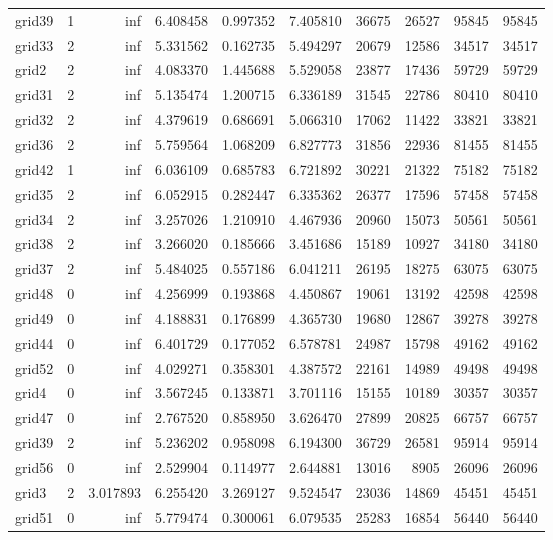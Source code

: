 \begin{longtable}{|l|r|r|r|r|r|r|r|r|r|}
grid39 & 1 & inf & 6.408458 & 0.997352 & 7.405810 & 36675 & 26527 & 95845 & 95845 \\
grid33 & 2 & inf & 5.331562 & 0.162735 & 5.494297 & 20679 & 12586 & 34517 & 34517 \\
grid2 & 2 & inf & 4.083370 & 1.445688 & 5.529058 & 23877 & 17436 & 59729 & 59729 \\
grid31 & 2 & inf & 5.135474 & 1.200715 & 6.336189 & 31545 & 22786 & 80410 & 80410 \\
grid32 & 2 & inf & 4.379619 & 0.686691 & 5.066310 & 17062 & 11422 & 33821 & 33821 \\
grid36 & 2 & inf & 5.759564 & 1.068209 & 6.827773 & 31856 & 22936 & 81455 & 81455 \\
grid42 & 1 & inf & 6.036109 & 0.685783 & 6.721892 & 30221 & 21322 & 75182 & 75182 \\
grid35 & 2 & inf & 6.052915 & 0.282447 & 6.335362 & 26377 & 17596 & 57458 & 57458 \\
grid34 & 2 & inf & 3.257026 & 1.210910 & 4.467936 & 20960 & 15073 & 50561 & 50561 \\
grid38 & 2 & inf & 3.266020 & 0.185666 & 3.451686 & 15189 & 10927 & 34180 & 34180 \\
grid37 & 2 & inf & 5.484025 & 0.557186 & 6.041211 & 26195 & 18275 & 63075 & 63075 \\
grid48 & 0 & inf & 4.256999 & 0.193868 & 4.450867 & 19061 & 13192 & 42598 & 42598 \\
grid49 & 0 & inf & 4.188831 & 0.176899 & 4.365730 & 19680 & 12867 & 39278 & 39278 \\
grid44 & 0 & inf & 6.401729 & 0.177052 & 6.578781 & 24987 & 15798 & 49162 & 49162 \\
grid52 & 0 & inf & 4.029271 & 0.358301 & 4.387572 & 22161 & 14989 & 49498 & 49498 \\
grid4 & 0 & inf & 3.567245 & 0.133871 & 3.701116 & 15155 & 10189 & 30357 & 30357 \\
grid47 & 0 & inf & 2.767520 & 0.858950 & 3.626470 & 27899 & 20825 & 66757 & 66757 \\
grid39 & 2 & inf & 5.236202 & 0.958098 & 6.194300 & 36729 & 26581 & 95914 & 95914 \\
grid56 & 0 & inf & 2.529904 & 0.114977 & 2.644881 & 13016 & 8905 & 26096 & 26096 \\
grid3 & 2 & 3.017893 & 6.255420 & 3.269127 & 9.524547 & 23036 & 14869 & 45451 & 45451 \\
grid51 & 0 & inf & 5.779474 & 0.300061 & 6.079535 & 25283 & 16854 & 56440 & 56440 \\

\end{longtable}

